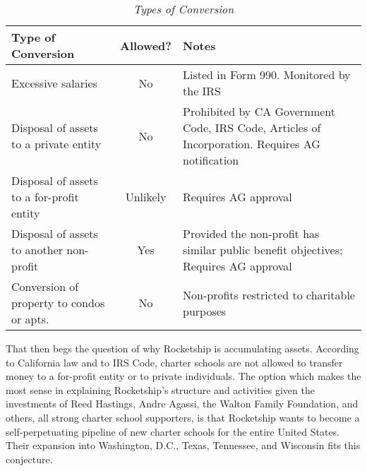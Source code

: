 \noindent%
\begin{table}[ht]
  \caption[Types of Conversion]{\textit{Types of Conversion}}%
  \label{tab:types_conversion}
  \begin{tabulary}{0.9\textwidth}{LCL}
    \toprule
    \textbf{Type of Conversion}               & \mbox{\textbf{Allowed?}} & \textbf{Notes}                                                                                                          \\
    \midrule
    Excessive salaries                        & No                       & Listed in Form 990. Monitored by the IRS \vspace{\baselineskip}                                                         \\
    Disposal of assets to a private entity    & No                       & Prohibited by CA Government Code, IRS Code, Articles of Incorporation. Requires AG notification \vspace{\baselineskip} \\
    Disposal of assets to a for-profit entity & Unlikely                 & Requires AG approval \vspace{3\baselineskip}                                                                            \\
    Disposal of assets to another non-profit  & Yes                      & Provided the non-profit has similar public benefit objectives; Requires AG approval \vspace{2\baselineskip}             \\
    Conversion of property to condos or apts. & No                       & Non-profits restricted to charitable purposes                                                                           \\
    \bottomrule
  \end{tabulary}
\end{table}

\vspace{-1\baselineskip}
That then begs the question of why Rocketship is accumulating assets. According to California law and to IRS Code, charter schools are not allowed to transfer money to a for-profit entity or to private individuals. The option which makes the most sense in explaining Rocketship's structure and activities given the investments of Reed Hastings, Andre Agassi, the Walton Family Foundation, and others, all strong charter school supporters, is that Rocketship wants to become a self-perpetuating pipeline of new charter schools for the entire United States. Their expansion into Washington, D.C., Texas, Tennessee, and Wisconsin fits this conjecture.

